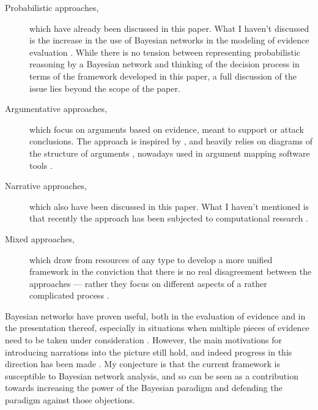 \documentclass[10pt,leqno]{article}
\begin{document}
\begin{description}
  \item[Probabilistic approaches,] which have   already been discussed in this paper. What I haven't discussed is the increase in the use of Bayesian networks in the modeling of evidence evaluation \citep[see e.g.][]{riesen2008validation,keppens2012argument,gittelson2013modeling,vlek2014building,vlek2016method}.  While there is no tension between representing probabilistic reasoning by a Bayesian network and thinking of the decision process in terms of the framework developed in this paper, a full discussion of the issue lies beyond the scope of the paper. 

\item[Argumentative approaches,]  which focus on arguments based on evidence, meant to support or attack conclusions. The approach is inspired by \citet{wigmore2012principles}, and heavily relies on diagrams of the structure of arguments \citep{anderson2007visualization,bex2003towards}, nowadays used in argument mapping software tools \citep{verheij2007argumentation}.

\item[Narrative approaches,] which also have been  discussed in this paper. What I haven't mentioned is that recently the approach has been subjected to computational research \citep{bex2013legal} .

\item[Mixed approaches,] which draw from resources of any type to develop a more unified framework in the conviction that there is no real disagreement between the approaches  \citep{spottswood2013bridging} --- rather they focus on different aspects of a rather complicated process \citep{shen2006scenario,bex2010hybrid,vlek2014building,verheij2014catch,verheij2015arguments,verheijproof2017}. 
\end{description}


 Bayesian networks have proven  useful, both in the evaluation of evidence and in the presentation thereof, especially in situations when multiple pieces of evidence need to be taken under consideration \citep{fenton2011avoiding,fenton2012limiting,lagnado2013legal,fenton2013general,gittelson2013modeling,fenton2014calculating}. However, the main motivations   for introducing narrations into the picture  still hold, and indeed progress in this direction has been made \citep{vlek2014building,vlek2016stories,vlek2016method}. My conjecture is that the current framework is susceptible to Bayesian network analysis, and so can be seen as a contribution towards increasing the power of the Bayesian paradigm and defending the paradigm against those objections.
\end{document}
